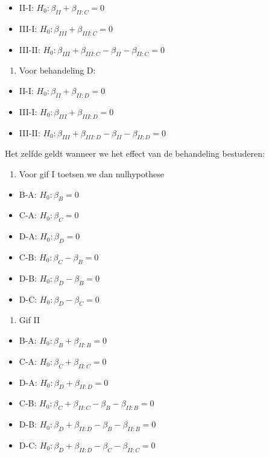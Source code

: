 \documentclass[
  12pt,dutch,coursenotes]{book}
\providecommand{\tightlist}{%
  \setlength{\itemsep}{0pt}\setlength{\parskip}{0pt}}
\begin{document}
\begin{itemize}
\tightlist
\item
  II-I: \(H_0: \beta_{II}+\beta_{II:C}=0\)
\item
  III-I: \(H_0: \beta_{III}+\beta_{III:C}=0\)
\item
  III-II: \(H_0: \beta_{III}+\beta_{III:C}-\beta_{II}-\beta_{II:C}=0\)
\end{itemize}

\begin{enumerate}
\def\labelenumi{\arabic{enumi}.}
\setcounter{enumi}{3}
\tightlist
\item
  Voor behandeling D:
\end{enumerate}

\begin{itemize}
\tightlist
\item
  II-I: \(H_0: \beta_{II}+\beta_{II:D}=0\)
\item
  III-I: \(H_0: \beta_{III}+\beta_{III:D}=0\)
\item
  III-II: \(H_0: \beta_{III}+\beta_{III:D}-\beta_{II}-\beta_{II:D}=0\)
\end{itemize}

Het zelfde geldt wanneer we het effect van de behandeling bestuderen:

\begin{enumerate}
\def\labelenumi{\arabic{enumi}.}
\tightlist
\item
  Voor gif I toetsen we dan nulhypothese
\end{enumerate}

\begin{itemize}
\tightlist
\item
  B-A: \(H_0: \beta_{B}=0\)
\item
  C-A: \(H_0: \beta_{C}=0\)
\item
  D-A: \(H_0: \beta_{D}=0\)
\item
  C-B: \(H_0: \beta_{C}-\beta_{B}=0\)
\item
  D-B: \(H_0: \beta_{D}-\beta_{B}=0\)
\item
  D-C: \(H_0: \beta_{D}-\beta_{C}=0\)
\end{itemize}

\begin{enumerate}
\def\labelenumi{\arabic{enumi}.}
\setcounter{enumi}{1}
\tightlist
\item
  Gif II
\end{enumerate}

\begin{itemize}
\tightlist
\item
  B-A: \(H_0: \beta_{B}+\beta_{II:B}=0\)
\item
  C-A: \(H_0: \beta_{C}+\beta_{II:C}=0\)
\item
  D-A: \(H_0: \beta_{D}+\beta_{II:D}=0\)
\item
  C-B: \(H_0: \beta_{C}+\beta_{II:C}-\beta_{B}-\beta_{II:B}=0\)
\item
  D-B: \(H_0: \beta_{D}+\beta_{II:D}-\beta_{B}-\beta_{II:B}=0\)
\item
  D-C: \(H_0: \beta_{D}+\beta_{II:D}-\beta_{C}-\beta_{II:C}=0\)
\end{itemize}
\end{document}
